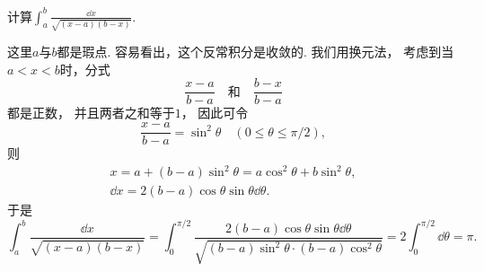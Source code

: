 \begin{example}
计算\(\int_a^b \frac{\dd{x}}{\sqrt{(x-a)(b-x)}}\).
\begin{solution}
这里\(a\)与\(b\)都是瑕点.
容易看出，这个反常积分是收敛的.
我们用换元法，
考虑到当\(a<x<b\)时，分式\[
	\frac{x-a}{b-a}
	\quad\text{和}\quad
	\frac{b-x}{b-a}
\]都是正数，
并且两者之和等于\(1\)，
因此可令\[
	\frac{x-a}{b-a} = \sin^2\theta
	\quad(0\leq\theta\leq\pi/2),
\]
则\begin{gather*}
	x = a + (b-a) \sin^2\theta
	= a \cos^2\theta + b \sin^2\theta, \\
	\dd{x} = 2(b-a) \cos\theta \sin\theta \dd{\theta}.
\end{gather*}
于是\[
	\int_a^b \frac{\dd{x}}{\sqrt{(x-a)(b-x)}}
	= \int_0^{\pi/2} \frac{2(b-a) \cos\theta \sin\theta \dd{\theta}}
		{\sqrt{(b-a) \sin^2\theta \cdot (b-a) \cos^2\theta}}
	= 2 \int_0^{\pi/2} \dd{\theta}
	= \pi.
\]
\end{solution}
\end{example}
